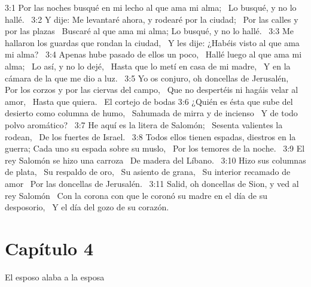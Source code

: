 3:1 Por las noches busqué en mi lecho al que ama mi alma;  
Lo busqué, y no lo hallé.  
3:2 Y dije: Me levantaré ahora, y rodearé por la ciudad;  
Por las calles y por las plazas  
Buscaré al que ama mi alma; 
Lo busqué, y no lo hallé.  
3:3 Me hallaron los guardas que rondan la ciudad,  
Y les dije: ¿Habéis visto al que ama mi alma?  
3:4 Apenas hube pasado de ellos un poco,  
Hallé luego al que ama mi alma;  
Lo así, y no lo dejé,  
Hasta que lo metí en casa de mi madre,  
Y en la cámara de la que me dio a luz.  
3:5 Yo os conjuro, oh doncellas de Jerusalén,  
Por los corzos y por las ciervas del campo,  
Que no despertéis ni hagáis velar al amor,  
Hasta que quiera.  
El cortejo de bodas 
3:6 ¿Quién es ésta que sube del desierto como columna de humo,  
Sahumada de mirra y de incienso  
Y de todo polvo aromático?  
3:7 He aquí es la litera de Salomón;  
Sesenta valientes la rodean,  
De los fuertes de Israel.  
3:8 Todos ellos tienen espadas, diestros en la guerra; 
Cada uno su espada sobre su muslo,  
Por los temores de la noche.  
3:9 El rey Salomón se hizo una carroza  
De madera del Líbano.  
3:10 Hizo sus columnas de plata,  
Su respaldo de oro,  
Su asiento de grana,  
Su interior recamado de amor  
Por las doncellas de Jerusalén.  
3:11 Salid, oh doncellas de Sion, y ved al rey Salomón  
Con la corona con que le coronó su madre en el día de su desposorio,  
Y el día del gozo de su corazón. 
\section*{Capítulo 4 }
El esposo alaba a la esposa  

